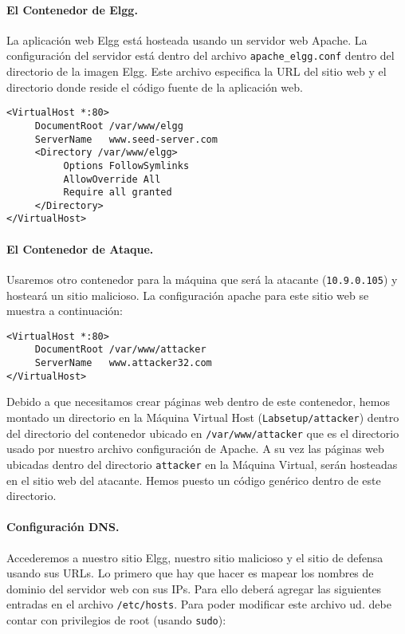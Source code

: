 \vspace{0.1in}
\paragraph{El Contenedor de Elgg.}
La aplicación web Elgg está hosteada usando un servidor web Apache.
La configuración del servidor está dentro del archivo \texttt{apache\_elgg.conf} dentro del directorio de la imagen Elgg.
Este archivo especifica la URL del sitio web y el directorio donde reside el código fuente de la aplicación web.

\begin{lstlisting}
<VirtualHost *:80>
     DocumentRoot /var/www/elgg
     ServerName   www.seed-server.com
     <Directory /var/www/elgg>
          Options FollowSymlinks
          AllowOverride All
          Require all granted
     </Directory>
</VirtualHost>
\end{lstlisting}

\paragraph{El Contenedor de Ataque.}
Usaremos otro contenedor para la máquina que será la atacante (\texttt{10.9.0.105}) y hosteará un sitio malicioso.
La configuración apache para este sitio web se muestra a continuación:

\begin{lstlisting}
<VirtualHost *:80>
     DocumentRoot /var/www/attacker
     ServerName   www.attacker32.com
</VirtualHost>
\end{lstlisting}
 
Debido a que necesitamos crear páginas web dentro de este contenedor, hemos montado un directorio en la Máquina Virtual Host (\texttt{Labsetup/attacker}) dentro del directorio del contenedor ubicado en \texttt{/var/www/attacker} que es el directorio usado por nuestro archivo configuración de Apache. A su vez las páginas web ubicadas dentro del directorio \texttt{attacker} en la Máquina Virtual, serán hosteadas en el sitio web del atacante. Hemos puesto un código genérico dentro de este directorio.

\paragraph{Configuración DNS.}
Accederemos a nuestro sitio Elgg, nuestro sitio malicioso y el sitio de defensa usando sus URLs.
Lo primero que hay que hacer es mapear los nombres de dominio del servidor web con sus IPs. Para ello deberá agregar las siguientes entradas en el archivo \texttt{/etc/hosts}.
Para poder modificar este archivo ud. debe contar con privilegios de root (usando \texttt{sudo}):

